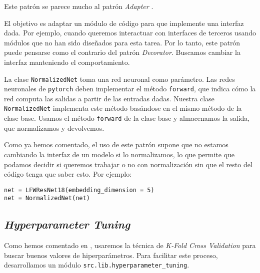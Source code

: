 \begin{observacion}

    Este patrón se parece mucho al patrón \textit{Adapter} \cite{informatica:design_patterns} \cite{informatica:adapter_pattern}.

    El objetivo es adaptar un módulo de código para que implemente una interfaz dada. Por ejemplo, cuando queremos interactuar con interfaces de terceros usando módulos que no han sido diseñados para esta tarea. Por lo tanto, este patrón puede pensarse como el contrario del patrón \textit{Decorator}. Buscamos cambiar la interfaz manteniendo el comportamiento.

\end{observacion}

La clase \lstinline{NormalizedNet} toma una red neuronal como parámetro. Las redes neuronales de \lstinline{pytorch} deben implementar el método \lstinline{forward}, que indica cómo la red computa las salidas a partir de las entradas dadas. Nuestra clase \lstinline{NormalizedNet} implementa este método basándose en el mismo método de la clase base. Usamos el método \lstinline{forward} de la clase base y almacenamos la salida, que normalizamos y devolvemos.

Como ya hemos comentado, el uso de este patrón supone que no estamos cambiando la interfaz de un modelo si lo normalizamos, lo que permite que podamos decidir si queremos trabajar o no con normalización sin que el resto del código tenga que saber esto. Por ejemplo:

\begin{lstlisting}[caption={Ejemplo de uso del patrón \textit{Decorator} para decidir si usamos o no normalización. El resto del código no tiene por qué saber este detalle de implementación, porque no cambiamos la interfaz de la clase}, captionpos=b]
net = LFWResNet18(embedding_dimension = 5)
net = NormalizedNet(net)
\end{lstlisting}

\subsection{\textit{Hyperparameter Tuning}} \label{isec:hp_tuning}

Como hemos comentado en , usaremos la técnica de \textit{K-Fold Cross Validation} para buscar buenos valores de hiperparámetros. Para facilitar este proceso, desarrollamos un módulo \lstinline{src.lib.hyperparameter_tuning}.

